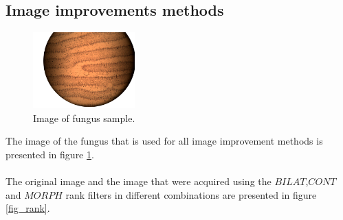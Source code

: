 \newpage

\subsection{Image improvements methods}

\begin{figure}
    \includegraphics[width=0.35\textwidth, frame]{afbeeldingen/fungus.png}
  	\caption{Image of fungus sample.}
  	\label{fig_fungus}
\end{figure}

The image of the fungus that is used for all image improvement methods is presented in figure \ref{fig_fungus}.\\
\\



The original image and the image that were acquired using the $BILAT$,$CONT$ and $MORPH$ rank filters in different combinations are presented in figure \ref{fig_rank}.


